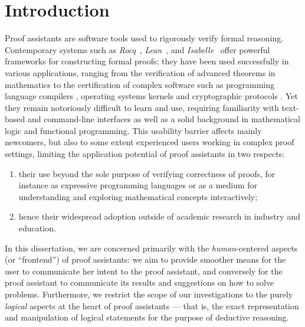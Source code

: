 \documentclass[11pt]{article}
\begin{document}

\section{Introduction}

Proof assistants are software tools used to rigorously verify formal reasoning. 
Contemporary systems such as \emph{Rocq}~\cite{the_rocq_development_team_2025_15149629}, \emph{Lean}~\cite{10.1007/978-3-030-79876-5_37}, and \emph{Isabelle}~\cite{nipkow2002isabelle} offer powerful frameworks for constructing formal proofs: they have been used successfully in various applications, ranging from the verification of advanced theorems in mathematics \cite{gonthierFormalProofFour2008,halesFormalProofKepler2024,commelinAbstractionBoundariesSpec2023} to the certification of complex software such as programming language compilers \cite{leroyFormalVerificationRealistic2009}, operating systems kernels \cite{kleinSeL4FormalVerification2009} and cryptographic protocols \cite{Barthe2014,wallezComparseProvablySecure2023}. Yet they remain notoriously difficult to learn and use, requiring familiarity with text-based and command-line interfaces as well as a solid background in mathematical logic and functional programming. This usability barrier affects mainly newcomers, but also to some extent experienced users working in complex proof settings, limiting the application potential of proof assistants in two respects:
\begin{enumerate}
    \item their use beyond the sole purpose of verifying correctness of proofs, for instance as expressive programming languages or as a medium for understanding and exploring mathematical concepts interactively;
    \item hence their widespread adoption outside of academic research in industry and education.
\end{enumerate}

In this dissertation, we are concerned primarily with the \emph{human}-centered aspects (or ``frontend'') of proof assistants: we aim to provide smoother means for the user to communicate her intent to the proof assistant, and conversely for the proof assistant to communicate its results and suggestions on how to solve problems. Furthermore, we restrict the scope of our investigations to the purely \emph{logical} aspects at the heart of proof assistants --- that is, the exact representation and manipulation of logical statements for the purpose of deductive reasoning.
\\
\end{document}
